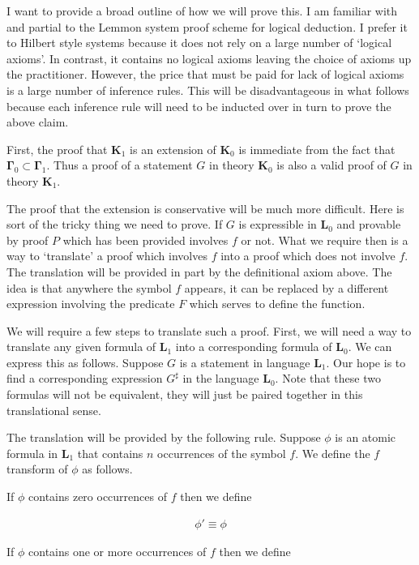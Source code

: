 \documentclass[12pt]{article}
\newcommand{\bv}[1]{\boldsymbol{#1}}
\begin{document}
I want to provide a broad outline of how we will prove this. I am familiar with and partial to the Lemmon system proof scheme for logical deduction. I prefer it to Hilbert style systems because it does not rely on a large number of `logical axioms'. In contrast, it contains no logical axioms leaving the choice of axioms up the practitioner. However, the price that must be paid for lack of logical axioms is a large number of inference rules. This will be disadvantageous in what follows because each inference rule will need to be inducted over in turn to prove the above claim.

First, the proof that $\bv{K}_1$ is an extension of $\bv{K}_0$ is immediate from the fact that $\bv{\Gamma}_0 \subset \bv{\Gamma}_1$. Thus a proof of a statement $G$ in theory $\bv{K}_0$ is also a valid proof of $G$ in theory $\bv{K}_1$.

The proof that the extension is conservative will be much more difficult. Here is sort of the tricky thing we need to prove. If $G$ is expressible in $\bv{L}_0$ and provable by proof $P$ which has been provided involves $f$ or not. What we require then is a way to `translate' a proof which involves $f$ into a proof which does not involve $f$. The translation will be provided in part by the definitional axiom above. The idea is that anywhere the symbol $f$ appears, it can be replaced by a different expression involving the predicate $F$ which serves to define the function.

We will require a few steps to translate such a proof. First, we will need a way to translate any given formula of $\bv{L}_1$ into a corresponding formula of $\bv{L}_0$. We can express this as follows. Suppose $G$ is a statement in language $\bv{L}_1$. Our hope is to find a corresponding expression $G^{\sharp}$ in the language $\bv{L}_0$. Note that these two formulas will not be equivalent, they will just be paired together in this translational sense.

The translation will be provided by the following rule. Suppose $\phi$ is an atomic formula in $\bv{L}_1$ that contains $n$ occurrences of the symbol $f$. We define the $f$ transform of $\phi$ as follows.

If $\phi$ contains zero occurrences of $f$ then we define

\begin{align}
\phi' \equiv \phi
\end{align}

If $\phi$ contains one or more occurrences of $f$ then we define
\end{document}
